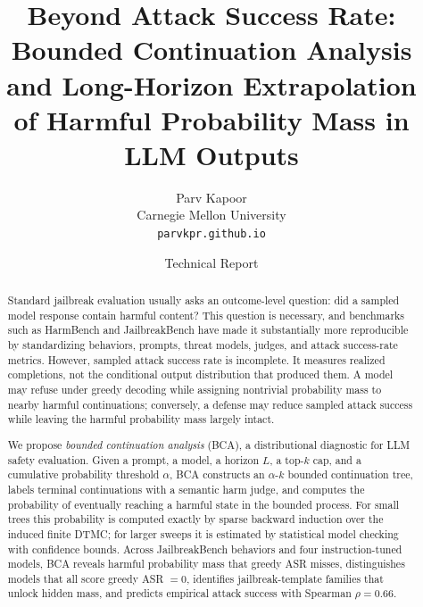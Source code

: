 \documentclass[11pt]{article}
\title{\vspace{-1.5em}
Beyond Attack Success Rate:\\
Bounded Continuation Analysis and Long-Horizon Extrapolation\\
of Harmful Probability Mass in LLM Outputs}
\author{
Parv Kapoor\\
Carnegie Mellon University\\
\texttt{parvkpr.github.io}
}
\date{Technical Report}
\newcommand{\BCA}{\textsc{BCA}}
\newcommand{\ASR}{\textsc{ASR}}
\newcommand{\DTMC}{\textsc{DTMC}}
\begin{document}
\maketitle

\begin{abstract}
Standard jailbreak evaluation usually asks an outcome-level question: did a sampled model response contain harmful content?  This question is necessary, and benchmarks such as HarmBench and JailbreakBench have made it substantially more reproducible by standardizing behaviors, prompts, threat models, judges, and attack success-rate metrics.  However, sampled attack success rate is incomplete.  It measures realized completions, not the conditional output distribution that produced them.  A model may refuse under greedy decoding while assigning nontrivial probability mass to nearby harmful continuations; conversely, a defense may reduce sampled attack success while leaving the harmful probability mass largely intact.

We propose \emph{bounded continuation analysis} (\BCA), a distributional diagnostic for LLM safety evaluation.  Given a prompt, a model, a horizon $L$, a top-$k$ cap, and a cumulative probability threshold $\alpha$, \BCA{} constructs an $\alpha$-$k$ bounded continuation tree, labels terminal continuations with a semantic harm judge, and computes the probability of eventually reaching a harmful state in the bounded process.  For small trees this probability is computed exactly by sparse backward induction over the induced finite \DTMC; for larger sweeps it is estimated by statistical model checking with confidence bounds.  Across JailbreakBench behaviors and four instruction-tuned models, \BCA{} reveals harmful probability mass that greedy \ASR{} misses, distinguishes models that all score greedy \ASR{} $=0$, identifies jailbreak-template families that unlock hidden mass, and predicts empirical attack success with Spearman $\rho=0.66$.


\end{abstract}
\end{document}
